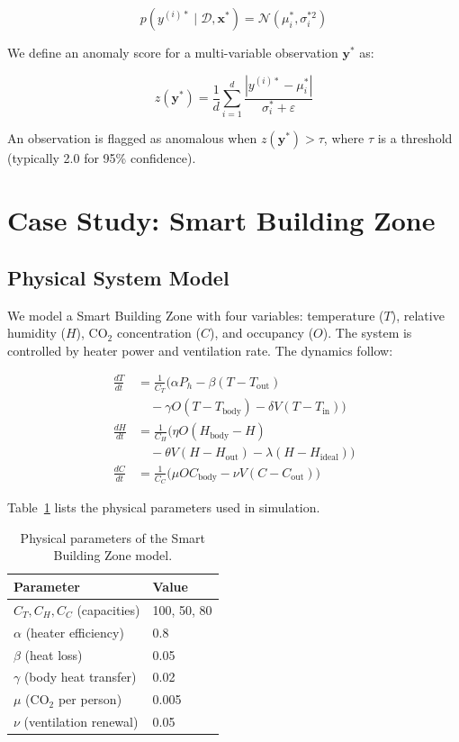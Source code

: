 \documentclass[conference]{IEEEtran}
\begin{document}
\begin{equation}
p(y^{(i)*} \mid \mathcal{D}, \mathbf{x}^*) = \mathcal{N}(\mu_i^*, \sigma_i^{*2})
\label{eq:pred}
\end{equation}

We define an anomaly score for a multi-variable observation $\mathbf{y}^*$ as:

\begin{equation}
z(\mathbf{y}^*) = \frac{1}{d} \sum_{i=1}^d \frac{|y^{(i)*} - \mu_i^*|}{\sigma_i^* + \varepsilon}
\label{eq:anomaly_score}
\end{equation}

An observation is flagged as anomalous when $z(\mathbf{y}^*) > \tau$, where $\tau$ is a threshold (typically 2.0 for 95\% confidence).

\section{Case Study: Smart Building Zone}
\label{sec:case_study}

\subsection{Physical System Model}
We model a Smart Building Zone with four variables: temperature ($T$), relative humidity ($H$), CO$_2$ concentration ($C$), and occupancy ($O$). The system is controlled by heater power and ventilation rate. The dynamics follow:

\begin{align}
\frac{dT}{dt} &= \frac{1}{C_T}\big(\alpha P_h - \beta(T - T_{\text{out}}) \nonumber \\
&\quad - \gamma O(T - T_{\text{body}}) - \delta V(T - T_{\text{in}})\big) \label{eq:dT} \\
\frac{dH}{dt} &= \frac{1}{C_H}\big(\eta O(H_{\text{body}} - H) \nonumber \\
&\quad - \theta V(H - H_{\text{out}}) - \lambda(H - H_{\text{ideal}})\big) \label{eq:dH} \\
\frac{dC}{dt} &= \frac{1}{C_C}\big(\mu O C_{\text{body}} - \nu V(C - C_{\text{out}})\big) \label{eq:dC}
\end{align}

Table~\ref{tab:params} lists the physical parameters used in simulation.

\begin{table}[t]
\centering
\caption{Physical parameters of the Smart Building Zone model.}
\label{tab:params}
\small
\begin{tabular}{ll}
\toprule
\textbf{Parameter} & \textbf{Value} \\
\midrule
$C_T, C_H, C_C$ (capacities) & 100, 50, 80 \\
$\alpha$ (heater efficiency) & 0.8 \\
$\beta$ (heat loss) & 0.05 \\
$\gamma$ (body heat transfer) & 0.02 \\
$\mu$ (CO$_2$ per person) & 0.005 \\
$\nu$ (ventilation renewal) & 0.05 \\
\bottomrule
\end{tabular}
\end{table}
\end{document}
